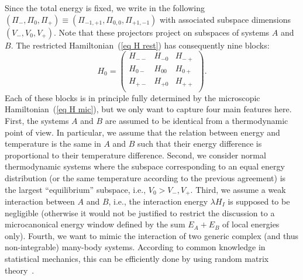 \documentclass[pre,onecolumn,12pt,aps,longbibliography,nofootinbib]{revtex4-2}
\begin{document}
Since the total energy is fixed, we write in the following $(\Pi_-,\Pi_0,\Pi_+) \equiv (\Pi_{-1,+1},\Pi_{0,0},\Pi_{+1,-1})$ with associated subspace dimensions $(V_-,V_0,V_+)$. Note that these projectors project on subspaces of systems $A$ {and} $B$. The restricted Hamiltonian~(\ref{eq H rest}) has consequently nine blocks:
\begin{equation}\label{eq block H}
 H_0 = \begin{pmatrix}
        H_{--} & H_{-0} & H_{-+} \\
        H_{0-} & H_{00} & H_{0+} \\
        H_{+-} & H_{+0} & H_{++} \\
       \end{pmatrix}.
\end{equation}
Each of these blocks is in principle fully determined by the microscopic Hamiltonian~(\ref{eq H mic}), but we only want to capture four main features here. First, the systems $A$ and $B$ are assumed to be {identical} from a thermodynamic point of view. In particular, we assume that the relation between energy and temperature is the same in $A$ and $B$ such that their energy difference is proportional to their temperature difference. Second, we consider {normal} thermodynamic systems where the subspace corresponding to an equal energy distribution (or the same temperature according to the previous agreement) is the largest ``equilibrium'' subspace, i.e., $V_0 > V_-,V_+$. Third, we assume a {weak interaction} between $A$ and $B$, i.e., the interaction energy $\lambda H_I$ is supposed to be negligible (otherwise it would not be justified to restrict the discussion to a microcanonical energy window defined by the sum $E_A+E_B$ of local energies only). Fourth, we want to mimic the interaction of two {generic} complex (and thus non-integrable) many-body systems. According to common knowledge in statistical mechanics, this can be efficiently done by using random matrix theory~\cite{Wigner1967, BrodyEtAlRMP1981, BeenakkerRMP1997, GuhrMuellerGroelingWeidenmuellerPR1998, HaakeBook2010, DAlessioEtAlAP2016, DeutschRPP2018}.
\end{document}
